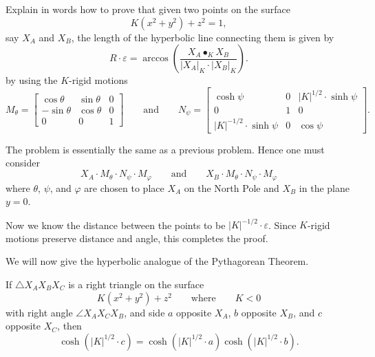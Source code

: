 \documentclass{ximera}
\begin{document}
\begin{problem}
  Explain in words how to prove that given two points on the surface
  \[
  K(x^2 + y^2) + z^2 =1,
  \]
  say $X_A$ and $X_B$, the length of the hyperbolic line connecting them
  is given by
  \[
  R\cdot \varepsilon = \arccos\left(\frac{X_A\bullet_K X_B}{|X_A|_K\cdot |X_B|_K}\right).
  \]
  by using the $K$-rigid motions
  \[
   M_\theta=
  \begin{bmatrix}
    \cos\theta & \sin\theta & 0\\
    -\sin\theta & \cos\theta & 0\\
    0 & 0 & 1
  \end{bmatrix}
  \qquad\text{and}\qquad
 N_\psi=
  \begin{bmatrix}
    \cosh\psi & 0 & |K|^{1/2}\cdot\sinh\psi\\
    0 & 1 & 0\\
    |K|^{-1/2}\cdot\sinh\psi & 0 & \cos\psi
  \end{bmatrix}.
  \]
  \begin{freeResponse}
    The problem is essentially the same as a previous problem. Hence one must consider
    \[
    X_A\cdot M_\theta\cdot N_\psi\cdot M_\varphi \qquad\text{and}\qquad
    X_B\cdot M_\theta\cdot N_\psi\cdot M_\varphi
    \]
    where $\theta$, $\psi$, and $\varphi$ are chosen to place $X_A$ on
    the North Pole and $X_B$ in the plane $y=0$.

    Now we know the distance between the points to be
    $|K|^{-1/2}\cdot\varepsilon$. Since $K$-rigid motions preserve
    distance and angle, this completes the proof.
  \end{freeResponse}
\end{problem}


We will now give the hyperbolic analogue of the Pythagorean Theorem.

\begin{theorem}
  If $\triangle X_AX_BX_C$ is a right triangle on the surface
  \[
  K(x^2+y^2)+z^2\qquad\text{where}\qquad K<0
  \]
  with right angle $\angle X_AX_CX_B$, and side $a$ opposite $X_A$,
  $b$ opposite $X_B$, and $c$ opposite $X_C$, then
  \[
  \cosh\left(|K|^{1/2}\cdot c\right)=\cosh\left(|K|^{1/2}\cdot a\right)\cosh\left(|K|^{1/2}\cdot b\right).
  \]
\end{theorem}
\end{document}
